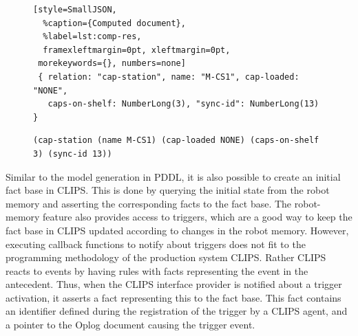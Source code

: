 \begin{figure}
\begin{lstlisting}[style=SmallJSON,
  %caption={Computed document},
  %label=lst:comp-res,
  framexleftmargin=0pt, xleftmargin=0pt,
 morekeywords={}, numbers=none]
 { relation: "cap-station", name: "M-CS1", cap-loaded: "NONE",
   caps-on-shelf: NumberLong(3), "sync-id": NumberLong(13) }
\end{lstlisting}
  \begin{lstlisting}[showlines,style=ReallySmallCLIPS,
    caption={Mapping between robot memory document and an unordered CLIPS fact},
  label=lst:clips-map,
  emph={skill, args, state, target, res},
  emphstyle=\bfseries\color{green!80!black},
  emph={[2]\?skill, \$\?args, cap-station, \?target, use,
  WAIT-FOR-LOCK, SKILL-EXECUTION, running},
  emphstyle={[2]\bfseries\color{blue!80!black}},
  morekeywords={retract, assert, modify, skill-call, skill-to-execute,
    wait-for-lock},
  numbers=none]
(cap-station (name M-CS1) (cap-loaded NONE) (caps-on-shelf 3) (sync-id 13))
\end{lstlisting} %
\end{figure}
Similar to the model generation in PDDL, it is also possible to create
an initial fact base in CLIPS. This is done by querying the initial
state from the robot memory and asserting the corresponding facts to
the fact base. The robot-memory feature also provides access to
triggers, which are a good way to keep the fact base in CLIPS updated
according to changes in the robot memory. However, executing callback
functions to notify about triggers does not fit to the programming
methodology of the production system CLIPS. Rather CLIPS reacts to
events by having rules with facts representing the event in the
antecedent. Thus, when the CLIPS interface provider is notified about
a trigger activation, it asserts a fact representing this to the fact
base. This fact contains an identifier defined during the registration
of the trigger by a CLIPS agent, and a pointer to the Oplog document
causing the trigger event.

